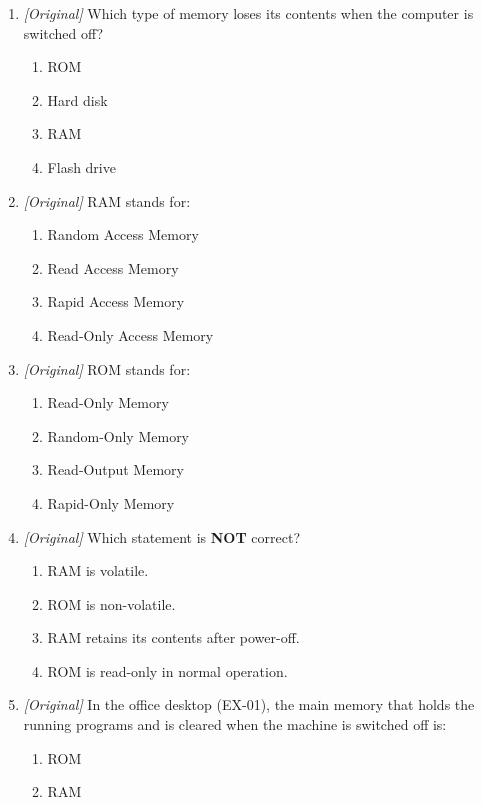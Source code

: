 \begin{enumerate}[label=\textbf{Q\arabic*.}, leftmargin=*]
\end{enumerate}
\begin{enumerate}[label=\textbf{Q\arabic*.}, leftmargin=*]
\item \textit{[Original]} Which type of memory loses its contents when the
  computer is switched off?
  \begin{enumerate}[label=\Alph*.]
    \item ROM
    \item Hard disk
    \item RAM
    \item Flash drive
  \end{enumerate}
\item \textit{[Original]} RAM stands for:
  \begin{enumerate}[label=\Alph*.]
    \item Random Access Memory
    \item Read Access Memory
    \item Rapid Access Memory
    \item Read-Only Access Memory
  \end{enumerate}
\item \textit{[Original]} ROM stands for:
  \begin{enumerate}[label=\Alph*.]
    \item Read-Only Memory
    \item Random-Only Memory
    \item Read-Output Memory
    \item Rapid-Only Memory
  \end{enumerate}
\item \textit{[Original]} Which statement is \textbf{NOT} correct?
  \begin{enumerate}[label=\Alph*.]
    \item RAM is volatile.
    \item ROM is non-volatile.
    \item RAM retains its contents after power-off.
    \item ROM is read-only in normal operation.
  \end{enumerate}
\item \textit{[Original]} In the office desktop (EX-01), the main memory that
  holds the running programs and is cleared when the machine is switched off
  is:
  \begin{enumerate}[label=\Alph*.]
    \item ROM
    \item RAM

\end{enumerate}
\end{enumerate}

